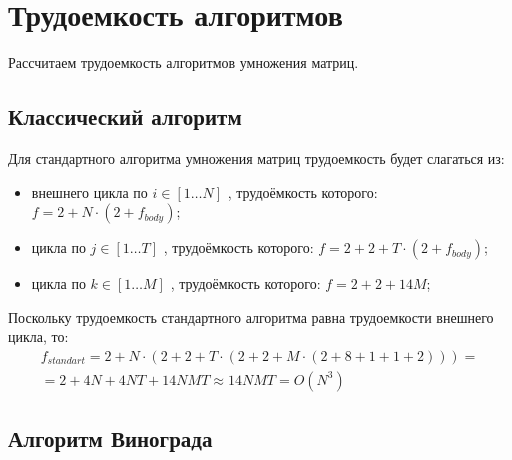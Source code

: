 \section{Трудоемкость алгоритмов}

Рассчитаем трудоемкость алгоритмов умножения матриц.

\subsection{Классический алгоритм}

Для стандартного алгоритма умножения матриц трудоемкость будет слагаться из:

\begin{itemize}
	\item внешнего цикла по $i \in [1 \ldots N]$ , трудоёмкость которого: $f = 2 + N \cdot (2 + f_{body})$;
	\item цикла по $j \in [1 \ldots T]$ , трудоёмкость которого: $f = 2 + 2 + T \cdot (2 + f_{body})$;
	\item цикла по $k \in [1 \ldots M]$ , трудоёмкость которого: $f = 2 + 2 + 14M$;
\end{itemize}

Поскольку трудоемкость стандартного алгоритма равна трудоемкости внешнего цикла, то:
\begin{equation}
	\label{сomplexity:standart}
	\begin{aligned}
		f_{standart} = 2 + N \cdot (2 + 2 + T \cdot (2 + 2 + M \cdot (2 + 8 + 1 + 1 + 2)))= \\
		= 2 + 4N + 4NT + 14NMT \approx 14NMT = O(N^3)
	\end{aligned}
\end{equation}

\subsection{Алгоритм Винограда}

